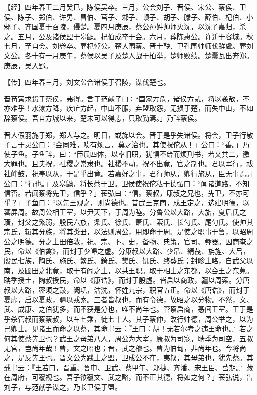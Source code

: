 \documentclass[]{article}
\begin{document}
【经】四年春王二月癸巳，陈侯吴卒。三月，公会刘子、晋侯、宋公、蔡侯、卫侯、陈子、郑伯、许男、曹伯、莒子、邾子、顿子、胡子、滕子、薛伯、杞伯、小邾子、齐国夏于召陵，侵楚。夏四月庚辰，蔡公孙姓帅师灭沈，以沈子嘉归，杀之。五月，公及诸侯盟于皋鼬。杞伯成卒于会。六月，葬陈惠公。许迁于容城。秋七月，至自会。刘卷卒。葬杞悼公。楚人围蔡。晋士鞅、卫孔围帅师伐鲜虞。葬刘文公。冬十有一月庚午，蔡侯以吴子及楚人战于柏举，楚师败绩。楚囊瓦出奔郑。庚辰，吴入郢。

【传】四年春三月，刘文公合诸侯于召陵，谋伐楚也。

晋荀寅求货于蔡侯，弗得。言于范献子曰：``国家方危，诸侯方贰，将以袭敌，不亦难乎！水潦方降，疾疟方起，中山不服，弃盟取怨，无损于楚，而失中山，不如辞蔡侯。吾自方城以来，楚未可以得志，只取勤焉。」乃辞蔡侯。

晋人假羽旄于郑，郑人与之。明日，或旆以会。晋于是乎失诸侯。将会，卫子行敬子言于灵公曰：``会同难，啧有烦言，莫之治也。其使祝佗从！」公曰：``善。」乃使子鱼。子鱼辞，曰：``臣展四体，以率旧职，犹惧不给而烦刑书，若又共二，徼大罪也。且夫祝，社稷之常隶也。社稷不动，祝不出竟，官之制也。君以军行，祓社衅鼓，祝奉以从，于是乎出竟。若嘉好之事，君行师从，卿行旅从，臣无事焉。」公曰：``行也。」及皋鼬，将长蔡于卫。卫侯使祝佗私于苌弘曰：``闻诸道路，不知信否。若闻蔡将先卫，信乎？」苌弘曰：``信。蔡叔，康叔之兄也，先卫，不亦可乎？」子鱼曰：``以先王观之，则尚德也。昔武王克商，成王定之，选建明德，以蕃屏周。故周公相王室，以尹天下，于周为睦。分鲁公以大路，大旂，夏后氏之璜，封父之繁弱，殷民六族，条氏、徐氏、萧氏、索氏、长勺氏、尾勺氏。使帅其宗氏，辑其分族，将其类丑，以法则周公，用即命于周。是使之职事于鲁，以昭周公之明德。分之土田倍敦，祝、宗、卜、史，备物、典策，官司、彝器。因商奄之民，命以《伯禽》，而封于少皞之虚。分康叔以大路、少帛、綪茷、旃旌、大吕，殷民七族，陶氏、施氏、繁氏、錡氏、樊氏、饥氏、终葵氏；封畛土略，自武父以南，及圃田之北竟，取于有阎之土，以共王职。取于相土之东都，以会王之东蒐。聃季授土，陶叔授民，命以《康诰》，而封于殷虚。皆启以商政，疆以周索。分唐叔以大路，密须之鼓，阙巩，沽洗，怀姓九宗，职官五正。命以《唐诰》，而封于夏虚，启以夏政，疆以戎索。三者皆叔也，而有令德，故昭之以分物。不然，文、武、成康、之伯犹多，而不获是分也，唯不尚年也。管蔡启商，惎间王室。王于是乎杀管叔而蔡蔡叔，以车七乘，徒七十人。其子蔡仲，改行帅德，周公举之，以为己卿士。见诸王而命之以蔡，其命书云：『王曰：胡！无若尔考之违王命也。』若之何其使蔡先卫也？武王之母弟八人，周公为大宰，康叔为司寇，聃季为司空，五叔无官，岂尚年哉！曹，文之昭也；晋，武之穆也。曹为伯甸，非尚年也。今将尚之，是反先王也。晋文公为践土之盟，卫成公不在，夷叔，其母弟也，犹先蔡。其载书云：『王若曰，晋重、鲁申、卫武、蔡甲午、郑捷、齐潘、宋王臣、莒期。』藏在周府，可覆视也。吾子欲覆文、武之略，而不正其德，将如之何？」苌弘说，告刘子，与范献子谋之，乃长卫侯于盟。
\end{document}

